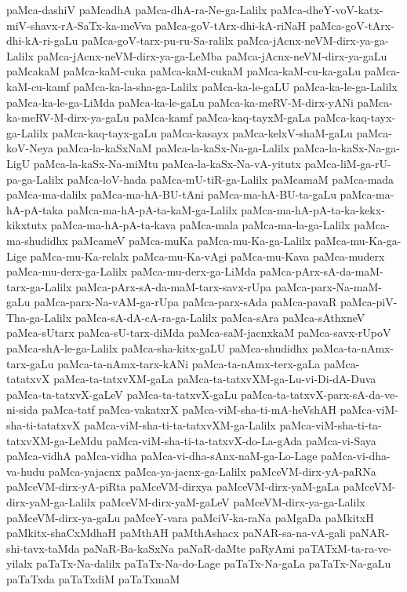 {paMca-dashiV
paMcadhA
paMca-dhA-ra-Ne-ga-Lalilx
paMca-dheY-voV-katx-miV-shavx-rA-SaTx-ka-meVva
paMca-goV-tArx-dhi-kA-riNaH
paMca-goV-tArx-dhi-kA-ri-gaLu
paMca-goV-tarx-pu-ru-Sa-ralilx
paMca-jAcnx-neVM-dirx-ya-ga-Lalilx
paMca-jAcnx-neVM-dirx-ya-ga-LeMba
paMca-jAcnx-neVM-dirx-ya-gaLu
paMcakaM
paMca-kaM-cuka
paMca-kaM-cukaM
paMca-kaM-cu-ka-gaLu
paMca-kaM-cu-kamf
paMca-ka-la-sha-ga-Lalilx
paMca-ka-le-gaLU
paMca-ka-le-ga-Lalilx
paMca-ka-le-ga-LiMda
paMca-ka-le-gaLu
paMca-ka-meRV-M-dirx-yANi
paMca-ka-meRV-M-dirx-ya-gaLu
paMca-kamf
paMca-kaq-tayxM-gaLa
paMca-kaq-tayx-ga-Lalilx
paMca-kaq-tayx-gaLu
paMca-kasayx
paMca-kelxV-shaM-gaLu
paMca-koV-Neya
paMca-la-kaSxNaM
paMca-la-kaSx-Na-ga-Lalilx
paMca-la-kaSx-Na-ga-LigU
paMca-la-kaSx-Na-miMtu
paMca-la-kaSx-Na-vA-yitutx
paMca-liM-ga-rU-pa-ga-Lalilx
paMca-loV-hada
paMca-mU-tiR-ga-Lalilx
paMcamaM
paMca-mada
paMca-ma-dalilx
paMca-ma-hA-BU-tAni
paMca-ma-hA-BU-ta-gaLu
paMca-ma-hA-pA-taka
paMca-ma-hA-pA-ta-kaM-ga-Lalilx
paMca-ma-hA-pA-ta-ka-kekx-kikxtutx
paMca-ma-hA-pA-ta-kava
paMca-mala
paMca-ma-la-ga-Lalilx
paMca-ma-shudidhx
paMcameV
paMca-muKa
paMca-mu-Ka-ga-Lalilx
paMca-mu-Ka-ga-Lige
paMca-mu-Ka-relalx
paMca-mu-Ka-vAgi
paMca-mu-Kava
paMca-muderx
paMca-mu-derx-ga-Lalilx
paMca-mu-derx-ga-LiMda
paMca-pArx-sA-da-maM-tarx-ga-Lalilx
paMca-pArx-sA-da-maM-tarx-savx-rUpa
paMca-parx-Na-maM-gaLu
paMca-parx-Na-vAM-ga-rUpa
paMca-parx-sAda
paMca-pavaR
paMca-piV-Tha-ga-Lalilx
paMca-sA-dA-cA-ra-ga-Lalilx
paMca-sAra
paMca-sAthxneV
paMca-sUtarx
paMca-sU-tarx-diMda
paMca-saM-jacnxkaM
paMca-savx-rUpoV
paMca-shA-le-ga-Lalilx
paMca-sha-kitx-gaLU
paMca-shudidhx
paMca-ta-nAmx-tarx-gaLu
paMca-ta-nAmx-tarx-kANi
paMca-ta-nAmx-terx-gaLa
paMca-tatatxvX
paMca-ta-tatxvXM-gaLa
paMca-ta-tatxvXM-ga-Lu-vi-Di-dA-Duva
paMca-ta-tatxvX-gaLeV
paMca-ta-tatxvX-gaLu
paMca-ta-tatxvX-parx-sA-da-ve-ni-sida
paMca-tatf
paMca-vakatxrX
paMca-viM-sha-ti-mA-heVshAH
paMca-viM-sha-ti-tatatxvX
paMca-viM-sha-ti-ta-tatxvXM-ga-Lalilx
paMca-viM-sha-ti-ta-tatxvXM-ga-LeMdu
paMca-viM-sha-ti-ta-tatxvX-do-La-gAda
paMca-vi-Saya
paMca-vidhA
paMca-vidha
paMca-vi-dha-sAnx-naM-ga-Lo-Lage
paMca-vi-dha-va-hudu
paMca-yajacnx
paMca-ya-jacnx-ga-Lalilx
paMceVM-dirx-yA-paRNa
paMceVM-dirx-yA-piRta
paMceVM-dirxya
paMceVM-dirx-yaM-gaLa
paMceVM-dirx-yaM-ga-Lalilx
paMceVM-dirx-yaM-gaLeV
paMceVM-dirx-ya-ga-Lalilx
paMceVM-dirx-ya-gaLu
paMceY-vara
paMciV-ka-raNa
paMgaDa
paMkitxH
paMkitx-shaCxMdhaH
paMthAH
paMthAshacx
paNAR-sa-na-vA-gali
paNAR-shi-tavx-taMda
paNaR-Ba-kaSxNa
paNaR-daMte
paRyAmi
paTATxM-ta-ra-ve-yilalx
paTaTx-Na-dalilx
paTaTx-Na-do-Lage
paTaTx-Na-gaLa
paTaTx-Na-gaLu
paTaTxda
paTaTxdiM
paTaTxmaM
}
